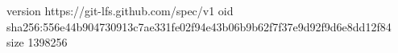version https://git-lfs.github.com/spec/v1
oid sha256:556e44b904730913c7ae331fe02f94e43b06b9b62f7f37e9d92f9d6e8dd12f84
size 1398256
